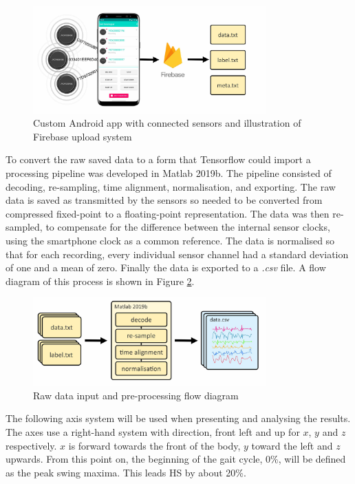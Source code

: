 \documentclass[sensors,article,submit,moreauthors,pdftex]{Definitions/mdpi}
\begin{document}
\begin{figure}[!hbt]
    \centering
    \includegraphics[width=0.8\textwidth]{Figures/movesense/sensor_collection.jpg}
    \caption{Custom Android app with connected sensors and illustration of Firebase upload system}
    \label{subfig:data_collection}
    \label{fig:data_collection_diagrams}
\end{figure}

To convert the raw saved data to a form that Tensorflow could import a processing pipeline was developed in Matlab 2019b. The pipeline consisted of decoding, re-sampling, time alignment, normalisation, and exporting. The raw data is saved as transmitted by the sensors so needed to be converted from compressed fixed-point to a floating-point representation. The data was then re-sampled, to compensate for the difference between the internal sensor clocks, using the smartphone clock as a common reference. The data is normalised so that for each recording, every individual sensor channel had a standard deviation of one and a mean of zero. Finally the data is exported to a \textit{.csv} file. A flow diagram of this process is shown in Figure \ref{fig:data_processing}.

\begin{figure}[!hbt]
    \centering
    \includegraphics[width=0.8\textwidth]{Figures/movesense/data_processing.jpg}
    \caption{Raw data input and pre-processing flow diagram}
    \label{fig:data_processing}
\end{figure}

The following axis system will be used when presenting and analysing the results. The axes use a right-hand system with direction, front left and up for $x$, $y$ and $z$ respectively. $x$ is forward towards the front of the body, $y$ toward the left and $z$ upwards. From this point on, the beginning of the gait cycle, 0\%, will be defined as the peak swing maxima. This leads HS by about 20\%.
\end{document}
